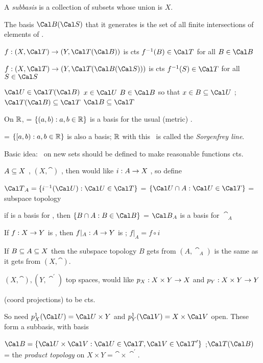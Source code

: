 \ssk

A {\it subbasis} is a collection \casm of subsets whose union is $X$. 

The basis $\cab(\cas)$ that it generates is the set of all finite intersections of elements of \casm .

\ssk

\hsk $f : (X,\cat)\ra (Y,\cat(\cab))$ is cts \lra $\finv(B)\in\cat$  for all  $B\in\cab$

\hsk $f : (X,\cat)\ra (Y,\cat(\cab(\cas)))$ is cts \lra $\finv(S)\in\cat$  for all  $S\in\cas$

\ssk

$\cau\in\cat(\cab)$ \lra \foa $x\in\cau$ \exs $B\in\cab$ so that $x\in B\sset \cau$ \hsk ; \hsk $\cat(\cab)\sset\cat$ \lra $\cab\sset\cat$

\ni On ${\Bbb R}$, \cabm = $\{(a,b) : a,b\in{\Bbb R}\}$ is a basis for the usual (metric) \top .

\ni \cabm = $\{[a,b) : a,b\in{\Bbb R}\}$ is also a basis; ${\Bbb R}$ with this \top\ is called the {\it Sorgenfrey line}.

\msk


\ni Basic idea: \tops\ on new sets should be defined to make reasonable functions cts.

$A\subseteq X$ , $(X,\cat)$ , then would like $i: A\rightarrow X$ \cts , so define

$\cat_A = \{i^{-1}(\cau) : \cau\in\cat\}$ = $\{\cau\cap A : \cau\in\cat\}$ = subspace topology

\hsk if \cabm is a basis for \catm, then $\{B\cap A : B\in\cab\}$ = $\cab_A$ is a basis for $\cat_A$

\hsk If $f: X\rightarrow Y$ is \cts, then $f|_A : A\rightarrow Y$ is \cts ; $f|_A = f\circ i$

If $B\subseteq A\subseteq X$ then the subspace topology $B$ gets from $(A,\cat_A)$ is the same as it gets
from $(X,\cat)$.

\ssk

$(X,\cat), (Y,\cat^\prime)$ top spaces, would like $p_X:X\times Y \rightarrow X$ and $p_Y:X\times Y \rightarrow Y$ 

(coord projections) to be cts. 

So need $p_X^{\-1}(\cau) = \cau\times Y$ and $p_Y^{\-1}(\cav) = X\times\cav$ open. These form a subbasis, with basis

$\cab = \{\cau\times\cav : \cau\in\cat, \cav\in\cat^\prime\}$ \hsk ;\hsk $\cat(\cab)$ = the {\it product topology} on $X\times Y$ = $\cat\times\cat^\prime$.


